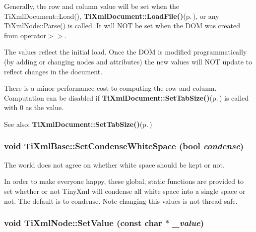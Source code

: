 Generally, the row and column value will be set when the Ti\-Xml\-Document::Load(), {\bf Ti\-Xml\-Document::Load\-File()}{\rm (p.\,\pageref{classTiXmlDocument_TiXmlDocumenta6})}, or any Ti\-Xml\-Node::Parse() is called. It will NOT be set when the DOM was created from operator$>$$>$.

The values reflect the initial load. Once the DOM is modified programmatically (by adding or changing nodes and attributes) the new values will NOT update to reflect changes in the document.

There is a minor performance cost to computing the row and column. Computation can be disabled if {\bf Ti\-Xml\-Document::Set\-Tab\-Size()}{\rm (p.\,\pageref{classTiXmlDocument_TiXmlDocumenta20})} is called with 0 as the value.

\begin{Desc}
\item[See also:]{\bf Ti\-Xml\-Document::Set\-Tab\-Size()}{\rm (p.\,\pageref{classTiXmlDocument_TiXmlDocumenta20})}\end{Desc}
\subsubsection{\setlength{\rightskip}{0pt plus 5cm}void Ti\-Xml\-Base::Set\-Condense\-White\-Space (bool {\em condense})\hspace{0.3cm}{\tt  [inline, static, inherited]}}\label{classTiXmlBase_TiXmlUnknowne0}


The world does not agree on whether white space should be kept or not. 

In order to make everyone happy, these global, static functions are provided to set whether or not Tiny\-Xml will condense all white space into a single space or not. The default is to condense. Note changing this values is not thread safe.
\subsubsection{\setlength{\rightskip}{0pt plus 5cm}void Ti\-Xml\-Node::Set\-Value (const char $\ast$ {\em \_\-value})\hspace{0.3cm}{\tt  [inline, inherited]}}\label{classTiXmlNode_TiXmlUnknowna9}


